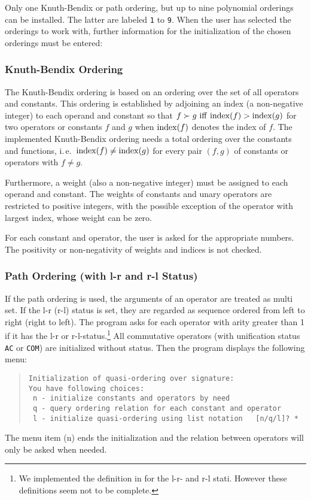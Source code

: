 Only one Knuth-Bendix or path ordering, but up to nine
polynomial orderings can be installed. The latter are labeled {\tt 1}
to {\tt 9}.
When the user has selected the orderings to work with, further information for
the initialization of the chosen orderings must be entered:

\subsubsection{Knuth-Bendix Ordering}
The Knuth-Bendix ordering \cite{KnuthBendix:67}
is based on an ordering over the set of all
operators and constants. This ordering is established by adjoining an index
(a non-negative integer) to each operand and constant so that
$f \succ g \ {\rm iff} \  {\rm index}(f) > {\rm index}(g)$
for two operators or constants $f$ and $g$ when ${\rm index}(f)$ denotes
the index of $f$.
The implemented
Knuth-Bendix ordering  needs a total ordering over the constants and
functions, i.\,e.\  ${\rm index}(f) \neq {\rm index}(g)$ for every pair
$(f,g)$ of constants or operators with $f \neq g$.

Furthermore, a weight (also a non-negative integer) must be assigned to
each operand and constant.
The weights of constants  and unary operators are restricted to positive
integers,
with the possible exception of the operator with largest index, whose
weight can be zero.

For each constant and operator, the user is asked for the appropriate
numbers. The positivity or non-negativity of weights and indices is
not checked.

\subsubsection{Path Ordering (with l-r and r-l Status)}
If the path ordering \cite{KapurNarendranSivakumar:85} is used,
the arguments of an operator are treated as multi set.
If the l-r (r-l) status is set, they are regarded as sequence
ordered from left to right (right to left).
The program asks for each operator with arity greater than 1 if it has 
the l-r or r-l-status.\footnote{We implemented the definition in
\cite{KapurNarendranSivakumar:85} for the l-r- and r-l stati.
However these definitions seem not to be complete.}
All commutative operators (with unification status {\tt AC} or {\tt COM})
are initialized without status.
Then the program displays the following menu:
\begin{quote}
\begin{verbatim}
Initialization of quasi-ordering over signature:
You have following choices: 
 n - initialize constants and operators by need
 q - query ordering relation for each constant and operator
 l - initialize quasi-ordering using list notation   [n/q/l]? *
\end{verbatim}
\end{quote} 
The menu item (n) ends the initialization and the relation between operators
will only be asked when needed.

